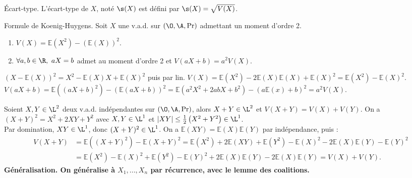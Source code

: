 \documentclass[11pt]{article}
\renewcommand*{\E}{\mathbb{E}}
\begin{document}
\begin{defi}{Écart-type.}{}
    L'écart-type de $X$, noté $\s(X)$ est défini par $\s(X)=\sqrt{V(X)}$.
\end{defi}

\begin{prop}{Formule de Koenig-Huygens.}{}
    Soit $X$ une v.a.d. sur $(\O,\A,\Pr)$ admettant un moment d'ordre 2.
    \begin{enumerate}
        \item $V(X)=\E(X^2) - (\E(X))^2$.
        \item $\forall a,b \in \R, ~ aX = b$ admet au moment d'ordre 2 et $V(aX+b)=a^2V(X)$.
    \end{enumerate}
    \tcblower
     $(X-\E(X))^2 = X^2 - \E(X)X + \E(X)^2$ puis par lin. $V(X) = \E(X^2) - 2\E(X)\E(X) + \E(X)^2= \E(X^2) - \E(X)^2$.\\
     $V(aX+b)=\E((aX+b)^2)-(\E(aX+b))^2 = \E(a^2X^2+2abX+b^2)-(a\E(x)+b)^2=a^2V(X)$.
\end{prop}

\begin{prop}{}{}
    Soient $X,Y\in\L^2$ deux v.a.d. indépendantes sur $(\O,\A,\Pr)$, alors $X+Y\in\L^2$ et $V(X+Y)=V(X)+V(Y)$.
    \tcblower
    On a $(X+Y)^2 = X^2 + 2XY + Y^2$ avec $X,Y\in\L^1$ et $|XY|\leq\frac{1}{2}\left( X^2+Y^2 \right)\in\L^1$.\\
    Par domination, $XY\in\L^1$, donc $(X+Y)^2\in\L^1$. On a $\E(XY)=\E(X)\E(Y)$ par indépendance, puis :
    \begin{align*}
        V(X+Y)&=\E((X+Y)^2) - \E(X+Y)^2 = \E(X^2) + 2\E(XY) + \E(Y^2) - \E(X)^2 - 2\E(X)\E(Y) - \E(Y)^2\\
        &= \E(X^2) - \E(X)^2 + \E(Y^2) - \E(Y)^2 + 2\E(X)\E(Y) - 2\E(X)\E(Y) = V(X) + V(Y).
    \end{align*}
    \bf{Généralisation.} On généralise à $X_1,...,X_n$ par récurrence, avec le lemme des coalitions. 
\end{prop}
\end{document}
